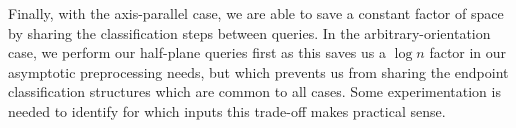 Finally, with the axis-parallel case, we are able to save a constant factor of space by sharing the classification steps between queries. 
In the arbitrary-orientation case, we perform our half-plane queries first as this saves us a $\log{n}$ factor in our asymptotic preprocessing needs, but which prevents us from sharing the endpoint classification structures which are common to all cases.  
Some experimentation is needed to identify for which inputs this trade-off makes practical sense.
